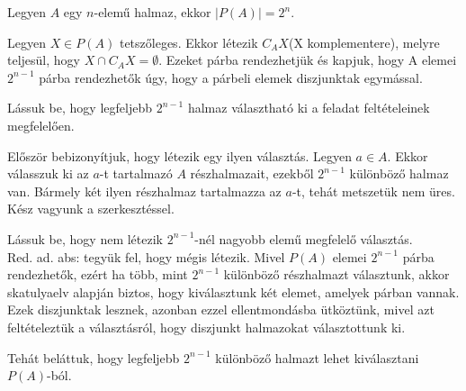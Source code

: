 \begin{solution}
	Legyen $A$ egy $n$-elemű halmaz, ekkor $|P(A)|=2^{n}$.
	
	Legyen $X\in P(A)$ tetszőleges. Ekkor létezik $C_{A}X$(X komplementere),
	melyre teljesül, hogy $X\cap C_{A}X=\emptyset$. Ezeket párba rendezhetjük
	és kapjuk, hogy A elemei $2^{n-1}$ párba rendezhetők úgy, hogy a
	párbeli elemek diszjunktak egymással.
	
	Lássuk be, hogy legfeljebb $2^{n-1}$ halmaz választható ki a feladat
	feltételeinek megfelelően.
	
	Először bebizonyítjuk, hogy létezik egy ilyen választás. Legyen $a\in A$.
	Ekkor válasszuk ki az $a$-t tartalmazó $A$ részhalmazait, ezekből
	$2^{n-1}$ különböző halmaz van. Bármely két ilyen részhalmaz tartalmazza
	az $a$-t, tehát metszetük nem üres. Kész vagyunk a szerkesztéssel.
	
	Lássuk be, hogy nem létezik $2^{n-1}$-nél nagyobb elemű megfelelő
	választás. \\
	Red. ad. abs: tegyük fel, hogy mégis létezik. Mivel $P(A)$ elemei
	$2^{n-1}$ párba rendezhetők, ezért ha több, mint $2^{n-1}$ különböző
	részhalmazt választunk, akkor skatulyaelv alapján biztos, hogy kiválasztunk
	két elemet, amelyek párban vannak. Ezek diszjunktak lesznek, azonban
	ezzel ellentmondásba ütköztünk, mivel azt feltételeztük a választásról,
	hogy diszjunkt halmazokat választottunk ki.
	
	Tehát beláttuk, hogy legfeljebb $2^{n-1}$ különböző halmazt lehet
	kiválasztani $P(A)$-ból.
\end{solution}

